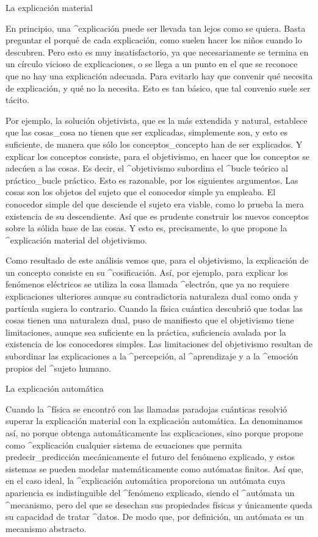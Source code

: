 \Section La explicación material

En principio, una ^{explicación} puede ser llevada tan lejos como se
quiera. Basta preguntar el porqué de cada explicación, como suelen hacer
los niños cuando lo descubren. Pero esto es muy insatisfactorio, ya que
necesariamente se termina en un círculo vicioso de explicaciones, o se
llega a un punto en el que se reconoce que no hay una explicación
adecuada. Para evitarlo hay que convenir qué necesita de explicación, y
qué no la necesita. Esto es tan básico, que tal convenio suele ser
tácito.


Por ejemplo, la solución objetivista, que es la más extendida y natural,
establece que las cosas_{cosa} no tienen que ser explicadas, simplemente
son, y esto es suficiente, de manera que sólo los conceptos_{concepto}
han de ser explicados. Y explicar los conceptos consiste, para el
objetivismo, en hacer que los conceptos se adecúen a las cosas. Es
decir, el ^{objetivismo} subordina el ^{bucle teórico} al
práctico_{bucle práctico}. Esto es razonable, por los siguientes
argumentos. Las cosas son los objetos del sujeto que el conocedor simple
ya empleaba. El conocedor simple del que desciende el sujeto era viable,
como lo prueba la mera existencia de su descendiente. Así que es
prudente construir los nuevos conceptos sobre la sólida base de las
cosas. Y esto es, precisamente, lo que propone la ^{explicación
material} del objetivismo.

Como resultado de este análisis vemos que, para el objetivismo, la
explicación de un concepto consiste en su ^{cosificación}. Así, por
ejemplo, para explicar los fenómenos eléctricos se utiliza la cosa
llamada ^{electrón}, que ya no requiere explicaciones ulteriores aunque
su contradictoria naturaleza dual como onda y partícula sugiera lo
contrario. Cuando la física cuántica descubrió que todas las cosas
tienen una naturaleza dual, puso de manifiesto que el objetivismo tiene
limitaciones, aunque sea suficiente en la práctica, suficiencia avalada
por la existencia de los conocedores simples. Las limitaciones del
objetivismo resultan de subordinar las explicaciones a la ^{percepción},
al ^{aprendizaje} y a la ^{emoción} propios del ^{sujeto} humano.


\Section La explicación automática

Cuando la ^{física} se encontró con las llamadas paradojas cuánticas
resolvió superar la explicación material con la explicación automática.
La denominamos así, no porque obtenga automáticamente las explicaciones,
sino porque propone como ^{explicación} cualquier sistema de ecuaciones
que permita predecir_{predicción} mecánicamente el futuro del fenómeno
explicado, y estos sistemas se pueden modelar matemáticamente como
autómatas finitos. Así que, en el caso ideal, la ^{explicación
automática} proporciona un autómata cuya apariencia es indistinguible
del ^{fenómeno} explicado, siendo el ^{autómata} un ^{mecanismo}, pero
del que se desechan sus propiedades físicas y únicamente queda su
capacidad de tratar ^{datos}. De modo que, por definición, un autómata
es un mecanismo abstracto.

